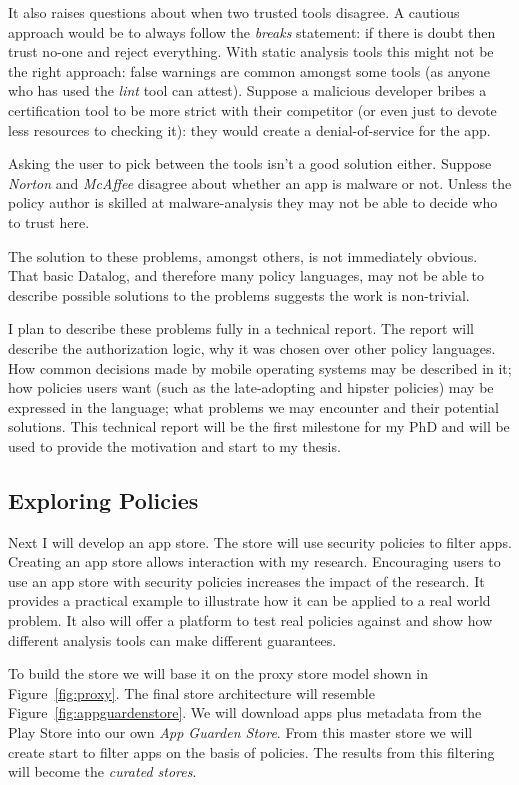 \documentclass[a4paper]{article}
\begin{document}
It also raises questions about when two trusted tools disagree.  A cautious
approach would be to always follow the \emph{breaks} statement: if there is
doubt then trust no-one and reject everything.  With static analysis tools this
might not be the right approach: false warnings are common amongst some tools
(as anyone who has used the \emph{lint} tool can attest).  Suppose a malicious
developer bribes a certification tool to be more strict with their competitor
(or even just to devote less resources to checking it): they would create a
denial-of-service for the app.

Asking the user to pick between the tools isn't a good solution either.  Suppose
\emph{Norton} and \emph{McAffee} disagree about whether an app is malware or
not. Unless the policy author is skilled at malware-analysis they may not be
able to decide who to trust here.  

The solution to these problems, amongst others, is not immediately obvious.
That basic Datalog, and therefore many policy languages, may not be able to
describe possible solutions to the problems suggests the work is non-trivial.

I plan to describe these problems fully in a technical report. The report will
describe the authorization logic, why it was chosen over other policy languages.
How common decisions made by mobile operating systems may be described in it;
how policies users want (such as the late-adopting and hipster policies) may be
expressed in the language; what problems we may encounter and their potential
solutions.
This technical report will be the first milestone for my PhD and will be used to
provide the motivation and start to my thesis.

\subsection{Exploring Policies}

Next I will develop an app store.  The store will use security policies to
filter apps.  Creating an app store allows interaction with my research.
Encouraging users to use an app store with security policies increases the
impact of the research. It provides a practical example to illustrate how it can
be applied to a real world problem.  It also will offer a platform to test real
policies against and show how different analysis tools can make different
guarantees.  

To build the store we will base it on the proxy store model shown in
Figure~\ref{fig:proxy}.  The final store architecture will resemble
Figure~\ref{fig:appguardenstore}.  We will download apps plus metadata from the Play Store
into our own \emph{App Guarden Store}.  From this master store we will create
start to filter apps on the basis of policies.  The results from this filtering
will become the \emph{curated stores}. 
\end{document}
